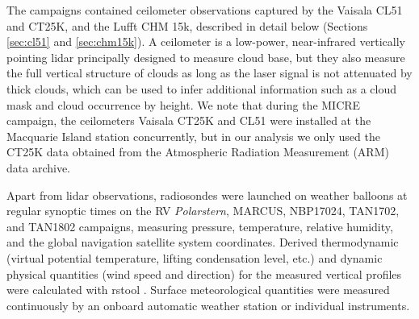 \documentclass[draft]{agujournal2019}
\begin{document}
The campaigns contained ceilometer observations captured by the Vaisala CL51 and CT25K, and the Lufft CHM 15k, described in detail below (Sections \ref{sec:cl51} and \ref{sec:chm15k}). A ceilometer is a low-power, near-infrared vertically pointing lidar principally designed to measure cloud base, but they also measure the full vertical structure of clouds as long as the laser signal is not attenuated by thick clouds, which can be used to infer additional information such as a cloud mask and cloud occurrence by height. We note that during the MICRE campaign, the ceilometers Vaisala CT25K and CL51 were installed at the Macquarie Island station concurrently, but in our analysis we only used the CT25K data obtained from the Atmospheric Radiation Measurement (ARM) data archive.

Apart from lidar observations, radiosondes were launched on weather balloons at regular synoptic times on the RV \emph{Polarstern}, MARCUS, NBP17024, TAN1702, and TAN1802 campaigns, measuring pressure, temperature, relative humidity, and the global navigation satellite system coordinates. Derived thermodynamic (virtual potential temperature, lifting condensation level, etc.) and dynamic physical quantities (wind speed and direction) for the measured vertical profiles were calculated with rstool \cite{rstool}. Surface meteorological quantities were measured continuously by an onboard automatic weather station or individual instruments.
\end{document}

